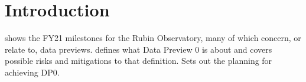 \section{Introduction}
 shows the FY21 milestones for the Rubin Observatory, many of which
concern, or relate to, data previews.
 defines what Data Preview 0 is about and covers possible risks and mitigations to that
definition.
 Sets out the planning for achieving DP0.


